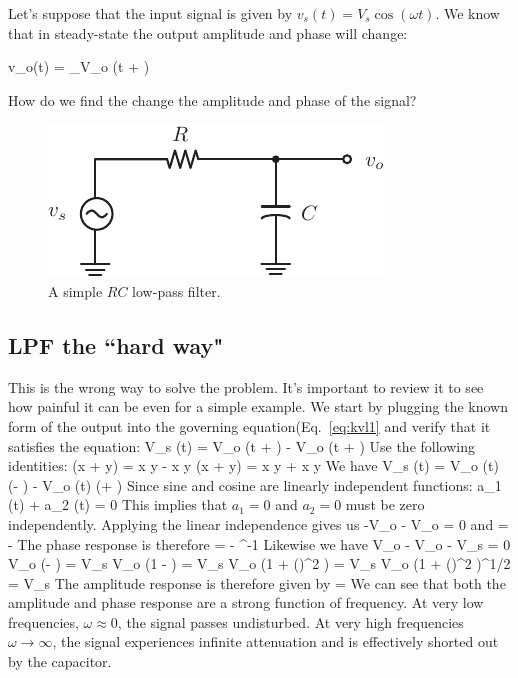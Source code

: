 Let's suppose that the input signal is given by $v_s(t) = V_s \cos(\omega t)$.  We know that in steady-state  the output amplitude and phase will change: 

\be v_o(t) = _{V_o} \cos(\omega t + \phi) \label{eq:kvl1} \ee
  
How do we find the change the amplitude and phase of the signal?

\begin{figure}[tb]
\begin{center}
\includegraphics[scale=1]{lpf}
\end{center}
\caption{A simple $RC$ low-pass filter. } \label{fig:lpf}
\end{figure}




\subsection{LPF the ``hard way"}


This is the wrong way to solve the problem.  It's important to review it to see how painful it can be even for a simple example.  We start by plugging the known form of the output into the governing equation(Eq.~\ref{eq:kvl1} and verify that it satisfies the equation:
\be
V_s \cos(\omega t) = V_o \cos(\omega t + \phi) - \tau \omega V_o \sin(\omega t + \phi)
\ee
Use the following identities:
\be
   \cos(x + y) = \cos x \cos y - \sin x \sin y
\ee
\be
   \sin(x + y) = \sin x \cos y + \cos x \sin y
\ee
We have
\be
V_s \cos(\omega t) = V_o \cos(\omega t) (\cos \phi - \tau \omega \sin\phi) -
V_o \sin(\omega t) (\sin\phi + \tau \omega \cos\phi)
\ee
Since sine and cosine are linearly independent functions:
\be
          a_1 \sin(\omega t) + a_2 \cos(\omega t) = 0
\ee
This implies that $a_1 = 0$ and $a_2 = 0$ must be zero independently.  Applying the linear independence gives us
\be
	-V_o \sin\phi - V_o \tau \omega \cos \phi = 0
\ee
and
\be
	\tan \phi = -\tau \omega
\ee
 The phase response is therefore 
\be
	\phi = - \tan^{-1} \tau \omega
\ee
Likewise we have
\be
	V_o \cos\phi - V_o \tau \omega \sin\phi - V_s = 0
\ee
\be
	V_o (\cos \phi - \tau \omega \sin\phi) = V_s 
\ee
\be
	V_o \cos \phi (1  - \tau \omega \tan\phi) = V_s 
\ee
\be
	V_o \cos \phi (1  + (\tau \omega)^2 ) = V_s 
\ee
\be
	V_o (1  + (\tau \omega)^2 )^{1/2} = V_s 
\ee
 The amplitude response is therefore given by
\be
  = 
\ee
We can see that both the amplitude and phase response are a strong function of frequency.  At very low frequencies, $\omega \approx 0$, the signal passes undisturbed.  At very high frequencies $\omega \rightarrow \infty$, the signal experiences infinite attenuation and is effectively shorted out by the capacitor.

